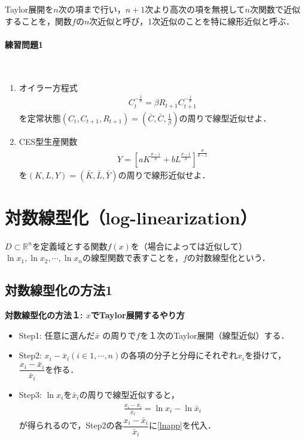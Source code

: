 \documentclass[a4paper,12pt,onecolumn,oneside,notitlepage,final]{article}
\begin{document}
Taylor展開を$n$次の項まで行い，$n+1$次より高次の項を無視して$n$次関数で近似することを，関数$f$の$n$次近似と呼び，1次近似のことを特に線形近似と呼ぶ．

\paragraph{練習問題1}~\\
\begin{enumerate}
\item オイラー方程式
\begin{align*}
C_t^{-\frac{1}{\sigma}} = \beta R_{t+1} C_{t+1}^{-\frac{1}{\sigma}}
\end{align*}
を定常状態$(C_t, C_{t+1}, R_{t+1}) = (\bar C, \bar C, \frac{1}{\beta})$の周りで線型近似せよ．

\item CES型生産関数
\begin{align}
Y = [a K^\frac{\theta -1}{\theta} + b L^\frac{\theta -1}{\theta}]^{\frac{\theta}{\theta -1}}
\end{align}
を$(K,L,Y)=(\bar K, \bar L, \bar Y)$の周りで線形近似せよ．
\end{enumerate}

\section{対数線型化（log-linearization）}

$D \subset \mathbb{R}^n$を定義域とする関数$f(x)$を（場合によっては近似して）$\ln x_1, \ln x_2, \cdots, \ln x_n$の線型関数で表すことを，$f$の対数線型化という．

\subsection{対数線型化の方法1}
\begin{itembox}[l]{{\bf 対数線型化の方法１: $x$でTaylor展開するやり方}}
\begin{itemize}
\item Step1: 任意に選んだ$\bar x$ の周りで$f$を１次のTaylor展開（線型近似）する．
\item Step2: $x_i - \bar x_i (i \in 1, \cdots, n)$の各項の分子と分母にそれぞれ$x_i$を掛けて，$\dfrac{x_i - \bar x_i}{\bar x_i}$を作る．
\item Step3: $\ln x_i$を$\bar x_i$の周りで線型近似すると，
\begin{align}
\frac{x_i - \bar x_i}{\bar x_i} = \ln x_i - \ln \bar x_i \label{lnapp}
\end{align} 
が得られるので，Step2の各$\dfrac{x_i - \bar x_i}{\bar x_i}$に\eqref{lnapp}を代入．
\end{itemize}
\end{itembox}
\end{document}
